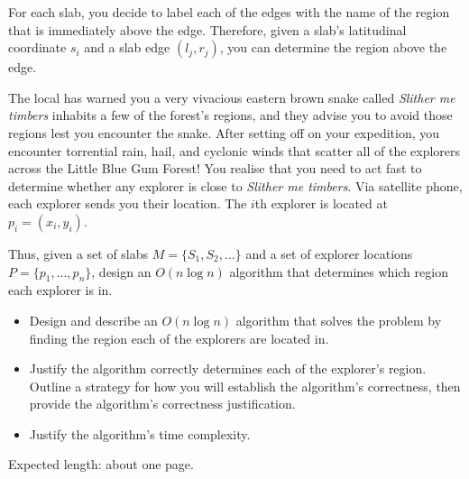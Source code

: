 \documentclass[12pt]{article}
\begin{document}
\begin{question}
\begin{center}
\end{center}

For each slab, you decide to label each of the edges with the name of the region that is immediately above the edge. Therefore, given a slab's latitudinal coordinate $s_i$ and a slab edge $(l_j, r_j)$, you can determine the region above the edge.

The local has warned you a very vivacious eastern brown snake called \emph{Slither me timbers} inhabits a few of the forest’s regions, and they advise you to avoid those regions lest you encounter the snake. After setting off on your expedition, you encounter torrential rain, hail, and cyclonic winds that scatter all of the explorers across the Little Blue Gum Forest! You realise that you need to act fast to determine whether any explorer is close to \emph{Slither me timbers}. Via satellite phone, each explorer sends you their location. The $i$th explorer is located at $p_i = (x_i, y_i)$.

Thus, given a set of slabs $M = \{S_1, S_2,...\}$ and a set of explorer locations $P = \{p_1, ..., p_n\}$, design an $O(n\log{n})$ algorithm that determines which region each explorer is in. 

\end{question}
\begin{rubric}
\begin{itemize}
    \item Design and describe an $O(n\log{n})$ algorithm that solves the problem by finding the region each of the explorers are located in. 
    \item Justify the algorithm correctly determines each of the explorer's region. Outline a strategy for how you will establish the algorithm's correctness, then provide the algorithm's correctness justification.
    \item Justify the algorithm's time complexity.
\end{itemize}
Expected length: about one page.
\end{rubric}

\begin{solution} 
\end{solution}

\begin{attribution}
\end{attribution}
\end{document}
